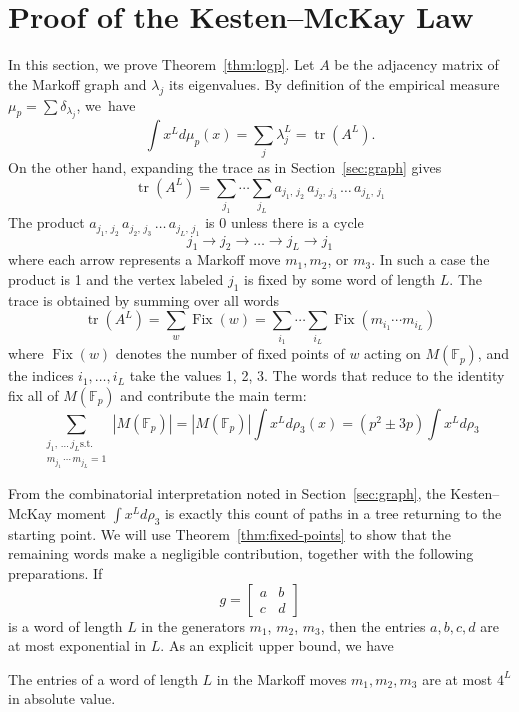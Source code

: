 \documentclass[10pt]{amsart}
\theoremstyle{definition}\newtheorem{defi}[theo]{Definition}\newtheorem{rema}[theo]{Remark}\newtheorem{exam}[theo]{Example}\newtheorem{exem}[theo]{Example}\newtheorem{nota}[theo]{Notation}
\newcommand{\F}{\mathbb{F}}
\DeclareMathOperator{\tr}{tr}
\DeclareMathOperator{\Fix}{Fix}
\begin{document}
\section{Proof of the Kesten--McKay Law} \label{sec:wrap-up}

In this section, we prove Theorem~\ref{thm:logp}. Let $A$ be the adjacency matrix of the Markoff graph and $\lambda_j$ its eigenvalues. By definition of the empirical measure $\mu_p = \sum \delta_{\lambda_j}$, we~have
\[
\int x^L d\mu_p(x) = \sum_j \lambda_j^L = \tr\left(A^L\right).
\]
On the other hand, expanding the trace as in Section~\ref{sec:graph} gives
\[
\tr\left(A^L\right) = \sum_{j_1} \cdots \sum_{j_L} a_{j_1,\,j_2}\,a_{j_2,\,j_3}\,\ldots\,a_{j_L,\,j_1}
\]
The product $a_{j_1,\,j_2}\,a_{j_2,\,j_3}\,\ldots \,a_{j_L,\,j_1}$ is 0 unless there is a cycle
\[
j_1 \rightarrow j_2 \rightarrow \ldots \rightarrow j_L \rightarrow j_1
\]
where each arrow represents a Markoff move $m_1, m_2$, or $m_3$. In such a case the product is 1 and the vertex labeled $j_1$ is fixed by some word of length $L$. The trace is obtained by summing over all words
\[
\tr(A^L) = \sum_w \Fix(w) = \sum_{i_1} \cdots \sum_{i_L} \Fix(m_{i_1}\cdots m_{i_L})
\]
where $\Fix(w)$ denotes the number of fixed points of $w$ acting on $M(\F_p)$, and the indices $i_1, \ldots, i_L$ take the values 1, 2, 3. The words that reduce to the identity fix all of $M(\F_p)$ and contribute the main term:
\[
\sum_{\substack{j_1,\,\ldots\,j_L \text{s.t.} \\ m_{j_1}\,\cdots\,m_{j_L}=1 }} |M(\F_p)| = |M(\F_p)| \int x^L d\rho_3(x) = \left(p^2 \pm 3p\right)\int x^L d\rho_3
\]

From the combinatorial interpretation noted in Section~\ref{sec:graph}, the Kesten--McKay moment $\int x^L d\rho_3$ is exactly this count of paths in a tree returning to the starting point. We will use Theorem~\ref{thm:fixed-points} to show that the remaining words make a negligible contribution, together with the following preparations. If
\[
g =
\begin{bmatrix}
a & b \\
c & d
\end{bmatrix}
\]
is a word of length $L$ in the generators $m_1$, $m_2$, $m_3$, then the entries $a, b, c, d$ are at most exponential in $L$. As an explicit upper bound, we have

\goodbreak
\begin{prop}\label{prop:bound-entries}
The entries of a word of length $L$ in the Markoff moves $m_1,m_2,m_3$ are at most $4^L$ in absolute value.
\end{prop}
\end{document}
